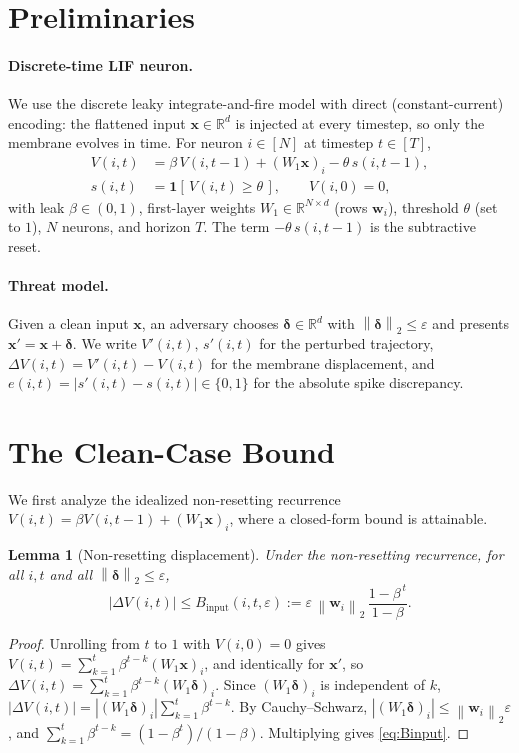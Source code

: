 \documentclass[10pt,twocolumn]{article}
\newtheorem{lemma}{Lemma}
\newcommand{\norm}[1]{\left\lVert #1 \right\rVert}
\newcommand{\abs}[1]{\left\lvert #1 \right\rvert}
\newcommand{\ind}{\mathbf{1}}
\newcommand{\eps}{\varepsilon}
\newcommand{\R}{\mathbb{R}}
\newcommand{\Bin}{B_{\mathrm{input}}}
\begin{document}
\section{Preliminaries}
\label{sec:prelim}

\paragraph{Discrete-time LIF neuron.} We use the discrete leaky integrate-and-fire model
\citep{gerstner2002spiking,eshraghian2023training} with direct (constant-current) encoding:
the flattened input $\bm{x}\in\R^d$ is injected at every timestep, so only the membrane
evolves in time. For neuron $i\in[N]$ at timestep $t\in[T]$,
\begin{align}
V(i,t) &= \beta\,V(i,t{-}1) + (W_1\bm{x})_i - \theta\,s(i,t{-}1), \label{eq:lif}\\
s(i,t) &= \ind\!\left[\,V(i,t)\ge\theta\,\right], \qquad V(i,0)=0, \label{eq:spk}
\end{align}
with leak $\beta\in(0,1)$, first-layer weights $W_1\in\R^{N\times d}$ (rows $\bm{w}_i$),
threshold $\theta$ (set to $1$), $N$ neurons, and horizon $T$. The term $-\theta\,s(i,t{-}1)$
is the subtractive reset.

\paragraph{Threat model.} Given a clean input $\bm{x}$, an adversary chooses
$\bm{\delta}\in\R^d$ with $\norm{\bm{\delta}}_2\le\eps$ and presents $\bm{x}'=\bm{x}+\bm{\delta}$.
We write $V'(i,t),\,s'(i,t)$ for the perturbed trajectory,
$\Delta V(i,t)=V'(i,t)-V(i,t)$ for the membrane displacement, and
$e(i,t)=\abs{s'(i,t)-s(i,t)}\in\{0,1\}$ for the absolute spike discrepancy.

\section{The Clean-Case Bound}
\label{sec:clean}

We first analyze the idealized non-resetting recurrence
$V(i,t)=\beta V(i,t{-}1)+(W_1\bm{x})_i$, where a closed-form bound is attainable.

\begin{lemma}[Non-resetting displacement]\label{lem:clean}
Under the non-resetting recurrence, for all $i,t$ and all $\norm{\bm{\delta}}_2\le\eps$,
\begin{equation}
\abs{\Delta V(i,t)} \le \Bin(i,t,\eps):=\eps\,\norm{\bm{w}_i}_2\,\frac{1-\beta^{\,t}}{1-\beta}.
\label{eq:Binput}
\end{equation}
\end{lemma}
\begin{proof}
Unrolling from $t$ to $1$ with $V(i,0)=0$ gives
$V(i,t)=\sum_{k=1}^{t}\beta^{t-k}(W_1\bm{x})_i$, and identically for $\bm{x}'$, so
$\Delta V(i,t)=\sum_{k=1}^{t}\beta^{t-k}(W_1\bm{\delta})_i$. Since $(W_1\bm{\delta})_i$ is
independent of $k$, $\abs{\Delta V(i,t)}=\abs{(W_1\bm{\delta})_i}\sum_{k=1}^{t}\beta^{t-k}$.
By Cauchy--Schwarz, $\abs{(W_1\bm{\delta})_i}\le\norm{\bm{w}_i}_2\eps$, and
$\sum_{k=1}^{t}\beta^{t-k}=(1-\beta^t)/(1-\beta)$. Multiplying gives \eqref{eq:Binput}.
\end{proof}
\end{document}
